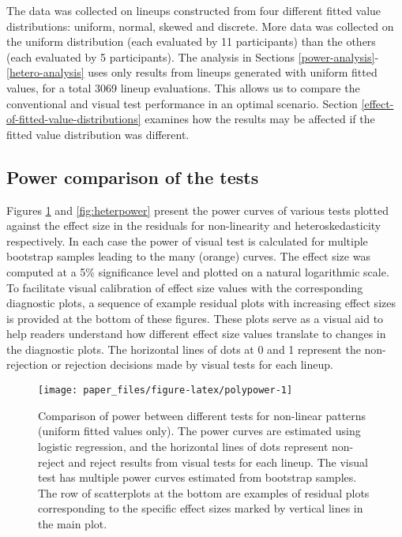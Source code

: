 \documentclass[]{interact}
\theoremstyle{plain}%
\theoremstyle{definition}
\theoremstyle{remark}
\begin{document}
The data was collected on lineups constructed from four different fitted
value distributions: uniform, normal, skewed and discrete. More data was
collected on the uniform distribution (each evaluated by 11
participants) than the others (each evaluated by 5 participants). The
analysis in Sections \ref{power-analysis}-\ref{hetero-analysis} uses
only results from lineups generated with uniform fitted values, for a
total 3069 lineup evaluations. This allows us to compare the
conventional and visual test performance in an optimal scenario. Section
\ref{effect-of-fitted-value-distributions} examines how the results may
be affected if the fitted value distribution was different.

\hypertarget{power-comparison-of-the-tests}{%
\subsection{\texorpdfstring{Power comparison of the
tests\label{power-analysis}}{Power comparison of the tests}}\label{power-comparison-of-the-tests}}

Figures \ref{fig:polypower} and \ref{fig:heterpower} present the power
curves of various tests plotted against the effect size in the residuals
for non-linearity and heteroskedasticity respectively. In each case the
power of visual test is calculated for multiple bootstrap samples
leading to the many (orange) curves. The effect size was computed at a
5\% significance level and plotted on a natural logarithmic scale. To
facilitate visual calibration of effect size values with the
corresponding diagnostic plots, a sequence of example residual plots
with increasing effect sizes is provided at the bottom of these figures.
These plots serve as a visual aid to help readers understand how
different effect size values translate to changes in the diagnostic
plots. The horizontal lines of dots at 0 and 1 represent the
non-rejection or rejection decisions made by visual tests for each
lineup.

\begin{figure}

{\centering \texttt{[image: paper\_files/figure-latex/polypower-1]} 

}

\caption{Comparison of power between different tests for non-linear patterns (uniform fitted values only). The power curves are estimated using logistic regression, and the horizontal lines of dots represent non-reject and reject results from visual tests for each lineup. The visual test has multiple power curves estimated from bootstrap samples. The row of scatterplots at the bottom are examples of residual plots corresponding to the specific effect sizes marked by vertical lines in the main plot.}\label{fig:polypower}
\end{figure}
\end{document}
